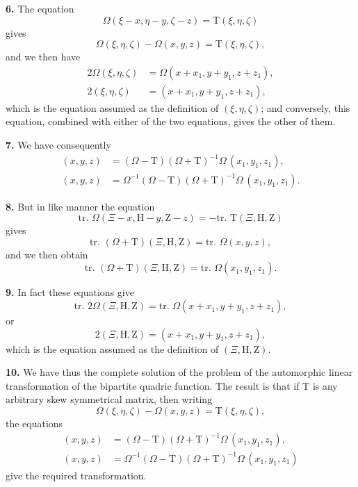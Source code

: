 \documentclass[11pt,a4paper]{book}
\begin{document}
\begin{center}
\newpage

\medskip
\noindent\textbf{6.} The equation
\[\Omega(\xi-x, \eta-y, \zeta-z) = \mathrm{T}(\xi,\eta,\zeta)\]
gives
\[\Omega(\xi,\eta,\zeta) - \Omega(x,y,z) = \mathrm{T}(\xi,\eta,\zeta),\]
and we then have
\begin{align*}
2\Omega(\xi,\eta,\zeta) &= \Omega(x+x_1, y+y_1, z+z_1), \\
2(\xi,\eta,\zeta) &= (x+x_1, y+y_1, z+z_1),
\end{align*}
which is the equation assumed as the definition of $(\xi,\eta,\zeta)$; and conversely, this equation, combined with either of the two equations, gives the other of them.

\medskip
\noindent\textbf{7.} We have consequently
\begin{align*}
(x,y,z) &= (\Omega - \mathrm{T})(\Omega + \mathrm{T})^{-1}\Omega\,(x_1,y_1,z_1), \\
(x,y,z) &= \Omega^{-1}(\Omega - \mathrm{T})(\Omega + \mathrm{T})^{-1}\Omega\,(x_1,y_1,z_1).
\end{align*}

\medskip
\noindent\textbf{8.} But in like manner the equation
\[\text{tr. }\Omega(\Xi-x, \mathrm{H}-y, \mathrm{Z}-z) = -\text{tr. }\mathrm{T}(\Xi,\mathrm{H},\mathrm{Z})\]
gives
\[\text{tr. }(\Omega + \mathrm{T})(\Xi,\mathrm{H},\mathrm{Z}) = \text{tr. }\Omega(x,y,z),\]
and we then obtain
\[\text{tr. }(\Omega + \mathrm{T})(\Xi,\mathrm{H},\mathrm{Z}) = \text{tr. }\Omega(x_1,y_1,z_1).\]

\medskip
\noindent\textbf{9.} In fact these equations give
\[\text{tr. }2\Omega(\Xi,\mathrm{H},\mathrm{Z}) = \text{tr. }\Omega(x+x_1, y+y_1, z+z_1),\]
or
\[2(\Xi,\mathrm{H},\mathrm{Z}) = (x+x_1, y+y_1, z+z_1),\]
which is the equation assumed as the definition of $(\Xi,\mathrm{H},\mathrm{Z})$.

\medskip
\noindent\textbf{10.} We have thus the complete solution of the problem of the automorphic linear transformation of the bipartite quadric function. The result is that if $\mathrm{T}$ is any arbitrary skew symmetrical matrix, then writing
\[\Omega(\xi,\eta,\zeta) - \Omega(x,y,z) = \mathrm{T}(\xi,\eta,\zeta),\]
the equations
\begin{align*}
(x,y,z) &= (\Omega - \mathrm{T})(\Omega + \mathrm{T})^{-1}\Omega\,(x_1,y_1,z_1), \\
(x,y,z) &= \Omega^{-1}(\Omega - \mathrm{T})(\Omega + \mathrm{T})^{-1}\Omega\,(x_1,y_1,z_1)
\end{align*}
give the required transformation.


\end{center}
\end{document}
